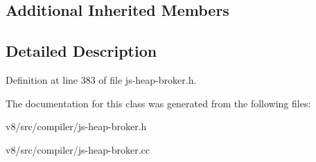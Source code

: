 \subsection*{Additional Inherited Members}


\subsection{Detailed Description}


Definition at line 383 of file js-\/heap-\/broker.\+h.



The documentation for this class was generated from the following files\+:\begin{DoxyCompactItemize}
\item 
v8/src/compiler/js-\/heap-\/broker.\+h\item 
v8/src/compiler/js-\/heap-\/broker.\+cc\end{DoxyCompactItemize}
